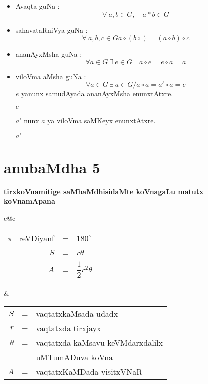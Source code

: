 \begin{itemize}
\item[\eng{(i)}] Avaqta guNa : 
$$
\forall \ a,b\in G,\quad a*b\in G
$$

\item[\eng{(ii)}] sahavataRniVya guNa : 
$$
\forall \ a,b,c\in G a\circ (b\circ )=(a\circ b)\circ c
$$

\item[\eng{(iii)}] ananAyxMsha guNa : 
$$
\forall a\in G \ \exists \ e\in G\quad a\circ e=e\circ a=a
$$

\item[\eng{(iv)}] viloVma aMsha guNa : 
$$
\forall a \in G \ \exists \ a \in G/ a\circ a= a'\circ a = e
$$
$e$ yanunx samudAyada ananAyxMsha enunxtAtxre.

$e$ 

$a'$ nunx $a$ ya viloVma saMKeyx enunxtAtxre.

$a'$ 
\end{itemize}

\chapter{anubaMdha 5}

\begin{center}
{\large\bf tirxkoVnamitige saMbaMdhisidaMte koVnagaLu matutx koVnamApana}
\smallskip

{\large\bf {}}
\end{center}

\begin{center}
\begin{tabular}{c@{\qquad\quad}c}
\begin{tabular}[t]{r@{\;\;}c@{\;\;}l}
$\pi$~ reVDiyanf & = & $180^{\circ}$\\[3pt]
$S$ & = & $r\theta$\\[3pt]
$A$ & = & $\dfrac{1}{2}r^{2}\theta$
\end{tabular}
&
\begin{tabular}[t]{r@{\;\;}c@{\;\;}l}
$S$ & = & vaqtatxkaMsada udadx\\[3pt]
$r$ & = & vaqtatxda tirxjayx\\[3pt]
$\theta$ & = & vaqtatxda kaMsavu keVMdarxdalilx\\[1pt]
         &   & uMTumADuva koVna\\[3pt]
$A$ & = & vaqtatxKaMDada visitxVNaR
\end{tabular}
\end{tabular}
\end{center}

